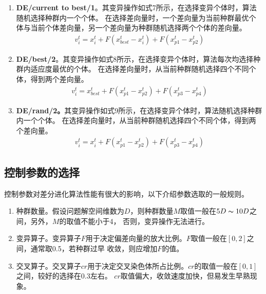 \documentclass[a4paper,11pt,onecolumn,twoside]{article}
\begin{document}
\begin{CJK*}{GBK}{song}
\begin{multicols}{2}
\begin{enumerate}[fullwidth,itemindent=2em,label=(\arabic*)]
\item {\bf DE/current to best/1}。其变异操作如式7所示，在选择变异个体时，算法随机选择种群内一个个体。
在选择差向量时，一个差向量为当前种群最优个体与当前个体差向量，另一个差向量为种群随机选择两个个体的差向量。
	\begin{equation}
		\begin{split}
			v_i^t = x_{i}^t+F\left(x_{best}^t-x_{i}^t\right)+F\left(x_{p1}^t-x_{p2}^t\right)
		\end{split}
	\end{equation}

\item {\bf DE/best/2}。其变异操作如式8所示，在选择变异个体时，算法每次均选择种群内适应度最优的个体。
在选择差向量时，从当前种群随机选择四个不同个体，得到两个差向量。
	\begin{equation}
		\begin{split}
			v_i^t=x_{best}^t+F\left(x_{p1}^t-x_{p2}^t\right)+F\left(x_{p3}^t-x_{p4}^t\right)
		\end{split}
	\end{equation}

\item {\bf DE/rand/2。}其变异操作如式9所示，在选择变异个体时，算法随机选择种群内一个个体。
在选择差向量时，从当前种群随机选择四个不同个体，得到两个差向量。
	\begin{equation}
		\begin{split}
			v_i^t=x_{i}^t+F\left(x_{p1}^t-x_{p2}^t\right)+F\left(x_{p3}^t-x_{p4}^t\right)
		\end{split}
	\end{equation}
\end{enumerate}

\subsection{控制参数的选择}
\indent 控制参数对差分进化算法性能有很大的影响，以下介绍参数选取的一般规则。
\begin{enumerate}[fullwidth,itemindent=2em,label=(\arabic*)]
\item {种群数量}。假设问题解空间维数为$D$，则种群数量$M$取值一般在$5D\thicksim 10D$之间，另外，$M$的取值不能小于4，
否则，变异操作无法进行。

\item {变异算子}。变异算子$F$用于决定偏差向量的放大比例。$F$取值一般在$[0,2]$之间，通常取0.5，若种群过早
收敛，则应增加$F$的值。

\item {交叉算子}。交叉算子$cr$用于决定交叉染色体所占比例。$cr$的取值一般在$[0,1]$之间，较好的选择在0.3左右。
$cr$取值偏大，收敛速度加快，但易发生早熟现象。
\end{enumerate}


\end{multicols}
\end{CJK*}
\end{document}
